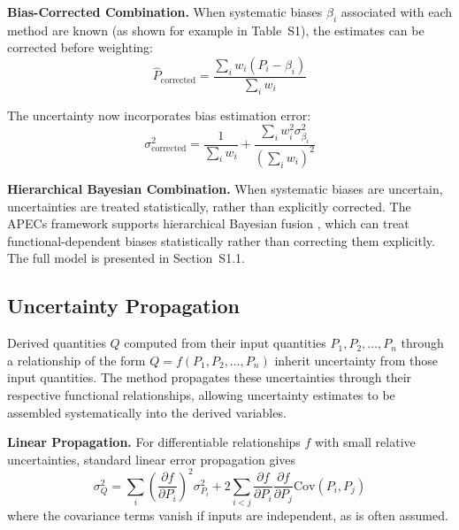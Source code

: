 \documentclass[twocolumn,superscriptaddress,amsmath,amssymb,longbibliography]{revtex4-2}
\begin{document}
{\bf Bias-Corrected Combination.}
When systematic biases $\beta_i$ associated with each method are known (as shown for example in Table~S1),
the estimates can be corrected before weighting:
\begin{equation}
    \hat{P}_{\mathrm{corrected}} = \frac{\sum_i w_i (P_i - \beta_i)}{\sum_i w_i}
    \label{eq:bias_corrected}
\end{equation}

The uncertainty now incorporates bias estimation error:
\begin{equation}
    \sigma_{\mathrm{corrected}}^2 = \frac{1}{\sum_i w_i} +
    \frac{\sum_i w_i^2 \sigma_{\beta_i}^2}{(\sum_i w_i)^2}
    \label{eq:bias_corrected_uncertainty}
\end{equation}

{\bf Hierarchical Bayesian Combination.}
When systematic biases are uncertain, uncertainties are treated statistically, rather than explicitly corrected. The APECs framework supports
hierarchical Bayesian fusion \cite{Kennedy2001,Sivia2006}, which can treat functional-dependent biases statistically rather than correcting them explicitly.
The full model
is presented in Section~S1.1.

\subsection{Uncertainty Propagation}
\label{sec:propagation}

Derived quantities $Q$ computed from their input quantities $P_1, P_2, \ldots, P_n$ through a relationship of the form $Q = f(P_1, P_2, \ldots, P_n)$ inherit uncertainty from
those input quantities. The method propagates these uncertainties through their respective functional relationships, allowing uncertainty estimates to be assembled systematically into the derived variables.

{\bf Linear Propagation.}
For differentiable relationships $f$ with small relative uncertainties, standard linear error
propagation gives \cite{JCGM2008_GUM}
\begin{equation}
    \sigma_Q^2 = \sum_i \left(\frac{\partial f}{\partial P_i}\right)^2 \sigma_{P_i}^2
    + 2 \sum_{i<j} \frac{\partial f}{\partial P_i} \frac{\partial f}{\partial P_j}
    \mathrm{Cov}(P_i, P_j)
    \label{eq:linear_prop}
\end{equation}
where the covariance terms vanish if inputs are independent, as is often assumed.
\end{document}
